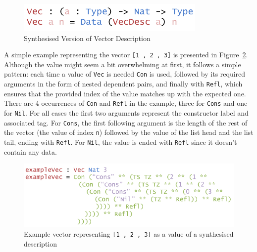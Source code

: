 \documentclass{ituthesis}
\newcommand{\ttconstructor}[1]{\textcolor{constructor-color}{\texttt{#1}}}
\newcommand{\ttdec}[1]{\textcolor{declared-var-color}{\texttt{#1}}}
\newcommand{\ttvar}[1]{\textcolor{local-var-color}{\texttt{#1}}}
\newcommand{\ttliteral}[1]{\textcolor{literal-color}{\texttt{#1}}}
\theoremstyle{break}
\begin{document}
\begin{figure}[ht]
\begin{center}
    \includegraphics[scale=0.5]{Figures/VectorSynthesisedDesc.png}
\end{center}
\caption{Synthesised Version of Vector Description}
\label{fig:synthversvecdesc}
\end{figure}

A simple example representing the vector \ttconstructor{[}\ttliteral{1}~\ttconstructor{,}~\ttliteral{2}~\ttconstructor{,}~\ttliteral{3}\ttconstructor{]} is presented in Figure~\ref{fig:exmvecsynthvecdesc}. Although the value might seem a bit overwhelming at first, it follows a simple pattern:
each time a value of \ttdec{Vec} is needed \ttconstructor{Con} is used, followed by its required arguments in the form of nested dependent pairs, and finally with \ttconstructor{Refl}, which ensures
that the provided index of the value matches up with the expected one.
There are 4 occurrences of \ttconstructor{Con} and \ttconstructor{Refl} in the example, three for  \ttconstructor{Cons} and one for \ttconstructor{Nil}.
For all cases the first two arguments represent the constructor label and associated tag. 
For \ttconstructor{Cons}, the first following argument is the length of the rest of the vector (the value of index \ttvar{n}) followed by the value of the list head and the list tail, ending with \ttconstructor{Refl}.
For \ttconstructor{Nil}, the value is ended with \ttconstructor{Refl} since it doesn't contain any data.


\begin{figure}[ht]
\begin{center}
    \includegraphics[scale=0.5]{Figures/VectorSynthesisedExample.png}
\end{center}
\caption{Example vector representing \ttconstructor{[}\ttliteral{1}~\ttconstructor{,}~\ttliteral{2}~\ttconstructor{,}~\ttliteral{3}\ttconstructor{]} as a value of a synthesised description}
\label{fig:exmvecsynthvecdesc}
\end{figure}
\end{document}
